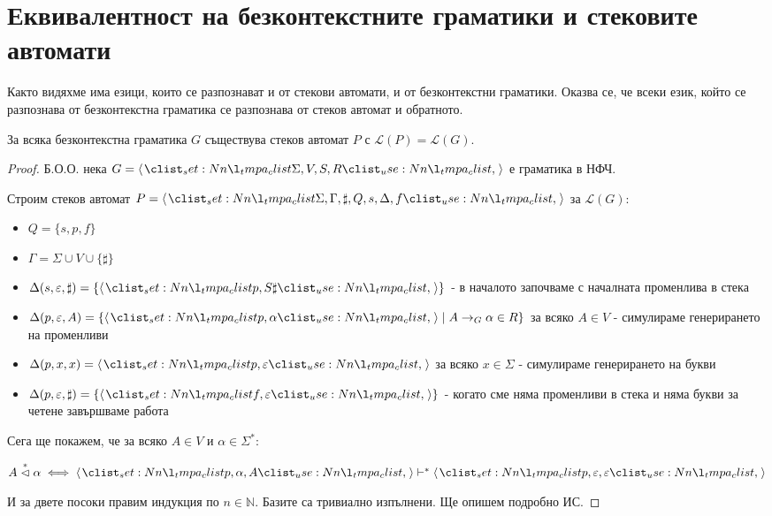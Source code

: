 \section{Еквивалентност на безконтекстните граматики и стековите автомати}

Както видяхме има езици, които се разпознават и от стекови автомати, и от безконтекстни граматики.
Оказва се, че всеки език, който се разпознава от безконтекстна граматика се разпознава от стеков автомат и обратното.

\begin{lemma}
    За всяка безконтекстна граматика $G$ съществува стеков автомат $P$ с $\mathcal{L}(P) = \mathcal{L}(G)$.
\end{lemma}

\begin{proof}
    Б.О.О. нека $G = \opair{\Sigma, V, S, R}$ е граматика в НФЧ.

    Строим стеков автомат $P = \opair{\Sigma, \Gamma, \sharp, Q, s, \Delta, f}$ за $\mathcal{L}(G)$:

    \begin{itemize}
        \item $Q = \{ s, p, f \}$
        \item $\Gamma = \Sigma \cup V \cup \{ \sharp \}$
        \item $\Delta(s, \varepsilon, \sharp) = \{ \opair{p, S \sharp} \}$ - в началото започваме с началната променлива в стека
        \item $\Delta(p, \varepsilon, A) = \{ \opair{p, \alpha} \mid A \rightarrow_G \alpha \in R \}$ за всяко $A \in V$ - симулираме генерирането на променливи
        \item $\Delta(p, x, x) = \opair{p, \varepsilon}$ за всяко $x \in \Sigma$ - симулираме генерирането на букви
        \item $\Delta(p, \varepsilon, \sharp) = \{ \opair{f, \varepsilon} \}$ - когато сме няма променливи в стека и няма букви за четене завършваме работа
    \end{itemize}

    Сега ще покажем, че за всяко $A \in V$ и $\alpha \in \Sigma^*$:

    \begin{center}
        $A \tri{*} \alpha \iff \opair{p, \alpha, A} \vdash^* \opair{p, \varepsilon, \varepsilon}$
    \end{center}

    И за двете посоки правим индукция по $n \in \mathbb{N}$.
    Базите са тривиално изпълнени.
    Ще опишем подробно ИС.


\end{proof}
